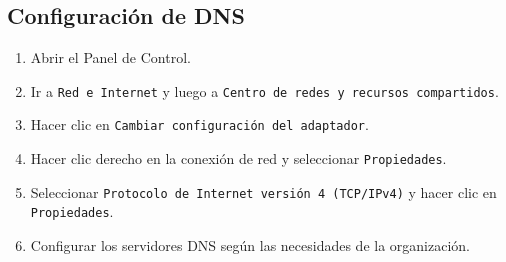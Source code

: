 \documentclass[11pt]{article}
\begin{document}
    \subsection{Configuración de DNS}
    \begin{enumerate}
        \item Abrir el Panel de Control.
        \item Ir a \texttt{Red e Internet} y luego a \texttt{Centro de redes y recursos compartidos}.
        \item Hacer clic en \texttt{Cambiar configuración del adaptador}.
        \item Hacer clic derecho en la conexión de red y seleccionar \texttt{Propiedades}.
        \item Seleccionar \texttt{Protocolo de Internet versión 4 (TCP/IPv4)} y hacer clic en \texttt{Propiedades}.
        \item Configurar los servidores DNS según las necesidades de la organización.
    \end{enumerate}

    
    
\end{document}
